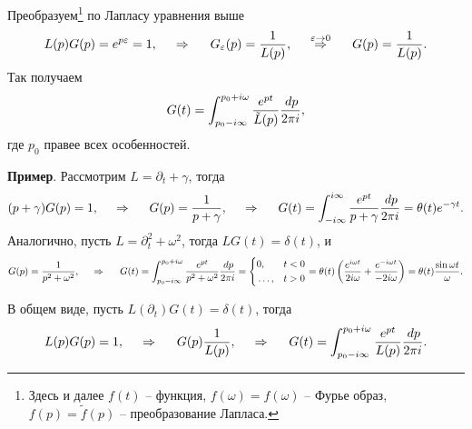 Преобразуем\footnote{
    Здесь и далее $f(t)$ -- функция, $f(\omega) = \hat{f}(\omega)$ -- Фурье образ, $f(p) = \tilde{f}(p)$ -- преобразование Лапласа.
}  по Лапласу уравнения выше
\begin{equation*}
     L(p) G(p) = e^{p \varepsilon} = 1,
     \hspace{0.5cm} \Rightarrow \hspace{0.5cm}
     G_\varepsilon (p) = \frac{1}{L(p)},
     \hspace{0.5cm} \overset{\varepsilon \to 0}{\Rightarrow}  \hspace{0.5cm}
     G(p) = \frac{1}{L(p)}.
 \end{equation*} 
Так получаем
\begin{equation}
    G(t) = \int_{p_0 - i \infty}^{p_0 + i \omega} \frac{e^{pt}}{\tilde{L}(p)} \frac{\, d p}{2\pi i},
\end{equation}
где $p_0$ правее всех особенностей. 




\textbf{Пример}. Рассмотрим $L = \partial_t + \gamma$, тогда
\begin{equation*}
    (p+\gamma) G(p) = 1,
    \hspace{0.5cm} \Rightarrow \hspace{0.5cm}
    G(p) = \frac{1}{p + \gamma},
    \hspace{0.5cm} \Rightarrow \hspace{0.5cm}
    G(t) = \int_{-i \infty}^{i \infty} \frac{e^{pt}}{p+\gamma} \frac{\, d p}{2 \pi i} = \theta(t) e^{- \gamma t}.
\end{equation*}
Аналогично, пусть $L = \partial_t^2 + \omega^2$, тогда $L G(t) = \delta(t)$, и
\begin{equation*}
    G(p) = \frac{1}{p^2 + \omega^2},
    \hspace{0.5cm} \Rightarrow \hspace{0.5cm}
    G(t) = \int_{p_0 - i \infty}^{p_0 + i \omega} \frac{e^{pt}}{p^2 + \omega^2} \frac{\, d p}{2 \pi i} = 
    \left\{\begin{aligned}
        &0, &t < 0 \\
        &\ldots, &t>0
    \end{aligned}\right. 
    = \theta(t) \left(
        \frac{e^{i \omega t}}{2 i \omega} + \frac{e^{- i \omega t}}{- 2 i \omega} 
    \right)
        = \theta(t) \frac{\sin \omega t}{\omega}.
\end{equation*}

В общем виде, пусть $L(\partial_t) G(t) = \delta(t)$, тогда
\begin{equation*}
    L(p) G(p) = 1,
    \hspace{0.5cm} \Rightarrow \hspace{0.5cm}
    G(p) \frac{1}{L(p)},
    \hspace{0.5cm} \Rightarrow \hspace{0.5cm}
    G(t) = \int_{p_0 - i \infty}^{p_0 + i \omega} \frac{e^{p t}}{L(p)} \frac{\, d p}{2 \pi i}.
\end{equation*}

